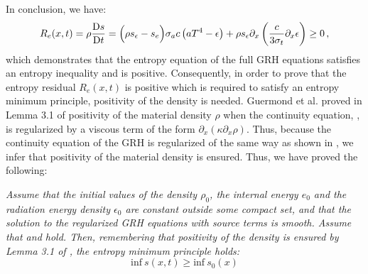 \documentclass[times,doublespace]{fldauth}%
\begin{document}
In conclusion, we have: 
\begin{equation} \label{eq:ineq_ent_eq}
R_e(x,t) = \rho \frac{\textrm{D} s}{\textrm{D} t} = \Big( \rho s_\epsilon -s_e \Big)  \sigma_a c \left( a T^4 - \epsilon \right) +   \rho s_\epsilon \partial_x \left( \frac{c}{3 \sigma_t} \partial_x \epsilon \right) \geq 0 \,,
\end{equation}
which demonstrates that the entropy equation of the full GRH equations satisfies an entropy inequality and is positive. Consequently, in order to prove that the entropy residual $R_e(x,t)$ is positive which is required to satisfy an entropy minimum principle, positivity of the density is needed. Guermond et al. proved in Lemma 3.1 of \cite{jlg} positivity of the material density $\rho$ when the continuity equation, , is regularized by a viscous term of the form $\partial_x ( \kappa \partial_x \rho )$. Thus, because the continuity equation of the GRH is regularized of the same way as shown in , we infer that positivity of the material density is ensured. Thus, we have proved the following:
%
\begin{theorem}
\emph{Assume that the initial values of the density $\rho_0$, the internal energy $e_0$ and the radiation energy density $\epsilon_0$ are constant outside some compact set, and that the solution to the regularized GRH equations with source terms is smooth. Assume that  and  hold. Then, remembering that positivity of the density is ensured by Lemma 3.1 of \cite{jlg}, the entropy minimum principle holds:
\begin{equation}
\text{inf} \ s(x,t) \geq \text{inf} \ s_0(x)
\end{equation}}
\end{theorem}
%
\end{document}
